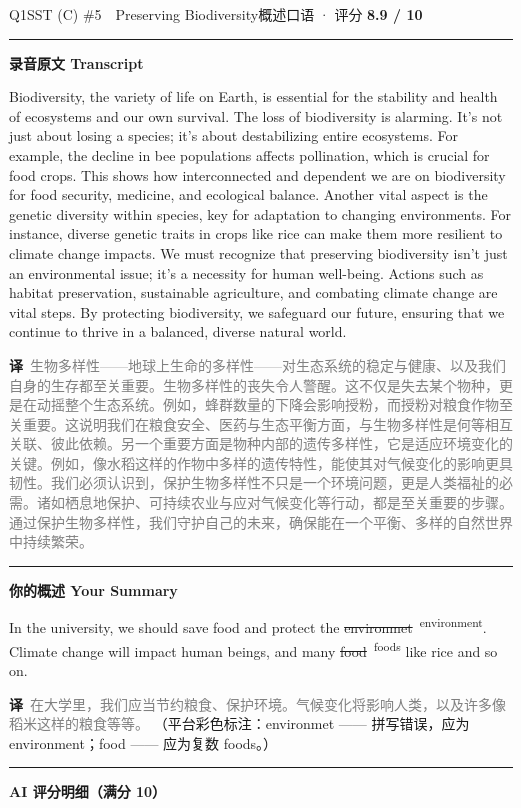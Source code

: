 \documentclass[11pt]{article}
\newcommand{\fix}[2]{%
  \colorbox{cWrongBg}{\textcolor{cWrong}{\sout{#1}}}%
  \,\textsuperscript{\textcolor{cFix}{\footnotesize #2}}}
\newcommand{\ptesub}[1]{%
  \par\needspace{2\baselineskip}\smallskip
  {\color{cAccent}\rule[-0.2ex]{3pt}{1.05em}}\hspace{6pt}%
  {\bfseries\color{cHead}#1}\par\nopagebreak\smallskip}
\newcommand{\zh}[1]{{\footnotesize\textcolor{cNote}{\textbf{译}}\ \textcolor{gray}{#1}}}
\begin{document}
\begin{qblock}{Q1\quad SST (C) \#5\ \ Preserving Biodiversity}{概述口语 · 评分 \textcolor{cAccent}{\bfseries 8.9 / 10}}
\ptesub{录音原文 Transcript}
\begin{promptbox}
Biodiversity, the variety of life on Earth, is essential for the stability and health of ecosystems and our own survival. The loss of biodiversity is alarming. It's not just about losing a species; it's about destabilizing entire ecosystems. For example, the decline in bee populations affects pollination, which is crucial for food crops. This shows how interconnected and dependent we are on biodiversity for food security, medicine, and ecological balance. Another vital aspect is the genetic diversity within species, key for adaptation to changing environments. For instance, diverse genetic traits in crops like rice can make them more resilient to climate change impacts. We must recognize that preserving biodiversity isn't just an environmental issue; it's a necessity for human well-being. Actions such as habitat preservation, sustainable agriculture, and combating climate change are vital steps. By protecting biodiversity, we safeguard our future, ensuring that we continue to thrive in a balanced, diverse natural world.
\end{promptbox}
\zh{生物多样性——地球上生命的多样性——对生态系统的稳定与健康、以及我们自身的生存都至关重要。生物多样性的丧失令人警醒。这不仅是失去某个物种，更是在动摇整个生态系统。例如，蜂群数量的下降会影响授粉，而授粉对粮食作物至关重要。这说明我们在粮食安全、医药与生态平衡方面，与生物多样性是何等相互关联、彼此依赖。另一个重要方面是物种内部的遗传多样性，它是适应环境变化的关键。例如，像水稻这样的作物中多样的遗传特性，能使其对气候变化的影响更具韧性。我们必须认识到，保护生物多样性不只是一个环境问题，更是人类福祉的必需。诸如栖息地保护、可持续农业与应对气候变化等行动，都是至关重要的步骤。通过保护生物多样性，我们守护自己的未来，确保能在一个平衡、多样的自然世界中持续繁荣。}
\ptesub{你的概述 Your Summary}
\begin{youbox}
In the university, we should save food and protect the \fix{environmet}{environment}. Climate change will impact human beings, and many \fix{food}{foods} like rice and so on.
\end{youbox}
\zh{在大学里，我们应当节约粮食、保护环境。气候变化将影响人类，以及许多像稻米这样的粮食等等。}
{\footnotesize\color{gray}（平台彩色标注：environmet —— 拼写错误，应为 environment；food —— 应为复数 foods。）}
\ptesub{AI 评分明细（满分 10）}
\begin{notebox}

\end{notebox}
\end{qblock}
\end{document}
